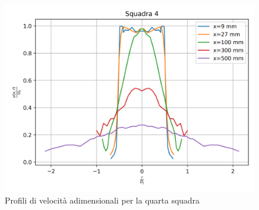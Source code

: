 \begin{figure}[H]
    \centering
    \includegraphics[width=.85\textwidth]{images/3/sq4u0.png}
    \caption{Profili di velocità adimensionali per la quarta squadra}
\end{figure}

